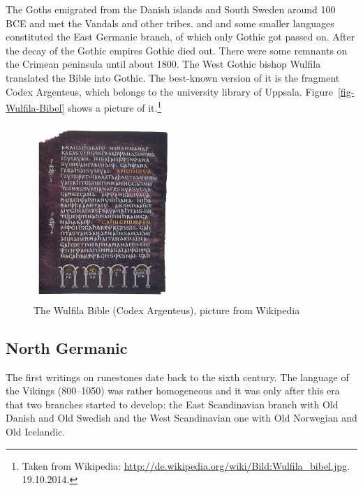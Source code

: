 The Goths emigrated from the Danish islands and South Sweden around 100 BCE and met the
Vandals and other tribes.
 and  and some smaller languages constituted the East Germanic branch, of which only Gothic got passed on.
After the decay of the Gothic empires Gothic died out. There were some remnants on the Crimean
peninsula until about 1800. The West Gothic bishop Wulfila translated the Bible into
Gothic.
 The
best-known version of it is the fragment Codex Argenteus, which belongs to the university library of
Uppsala. Figure~\vref{fig-Wulfila-Bibel} shows a picture of it.\footnote{
Taken from Wikipedia: \url{http://de.wikipedia.org/wiki/Bild:Wulfila_bibel.jpg}. 19.10.2014.
}
\begin{figure}
\includegraphics[width=53mm]{Pictures/Wulfila_bibel}
\caption{\label{fig-Wulfila-Bibel}The Wulfila Bible (Codex Argenteus), picture from Wikipedia}
\end{figure}



\subsection{North Germanic}

The first writings on runestones date back to the sixth century. The language of the Vikings
(800--1050) was rather homogeneous and it was only after this era that two branches started to
develop: the East Scandinavian branch with Old Danish and Old Swedish and the West Scandinavian one
with Old Norwegian and Old Icelandic.


